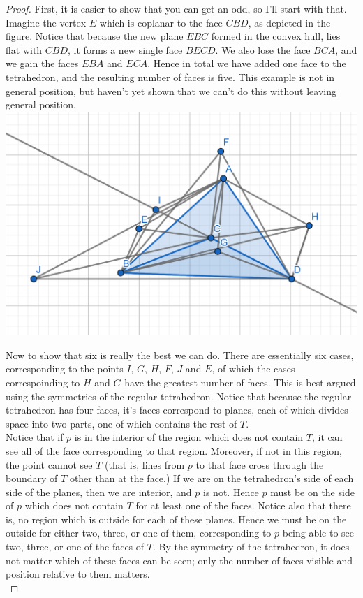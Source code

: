 \documentclass[12pt]{article}
\theoremstyle{definition}
\begin{document}
\begin{proof}
First, it is easier to show that you can get an odd, so I'll start with that. Imagine the vertex $E$ which is coplanar to the face $ CBD $, as depicted in the figure. Notice that because the new plane $EBC$ formed in the convex hull, lies flat with $CBD$, it forms a new single face $BECD$. We also lose the face $BCA$, and we gain the faces $EBA$ and $ECA$. Hence in total we have added one face to the tetrahedron, and the resulting number of faces is five. This example is not in general position, but haven't yet shown that we can't do this without leaving general position. \\
 
\includegraphics[scale=0.5]{bad_polyhedron_2.png} 

Now to show that six is really the best we can do. There are essentially six cases, corresponding to the points $I$, $G$, $H$, $F$, $J$ and $E$, of which the cases correspoinding to $H$ and $G$ have the greatest  number of faces. This is best argued using the symmetries of the regular tetrahedron. Notice that because the regular tetrahedron has four faces, it's faces correspond to planes, each of which divides space into two parts, one of which contains the rest of $T$.\\

Notice that if $p$ is in the interior of the region which does not contain $T$, it can see all of the face corresponding to that region. Moreover, if not in this region, the point cannot see $T$ (that is, lines from $p$ to that face cross through the boundary of $T$ other than at the face.) If we are on the tetrahedron's side of each side of the planes, then we are interior, and $p$ is not. Hence $p$ must be on the side of $p$ which does not contain $T$ for at least one of the faces. Notice also that there is, no region which is outside for each of these planes. Hence we must be on the outside for either two, three, or one of them, corresponding to $p$ being able to see two, three, or one of the faces of $T$. By the symmetry of the tetrahedron, it does not matter which of these faces can be seen; only the number of faces visible and position relative to them matters.\\


\end{proof}
\end{document}
